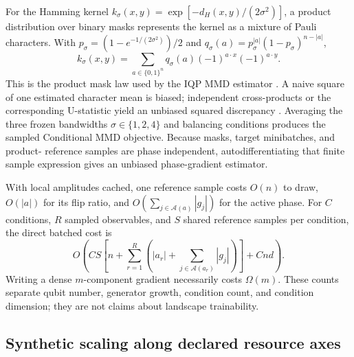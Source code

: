 \documentclass[a4paper,twocolumn,11pt,unpublished]{quantumarticle}
\newcommand{\bits}{\{0,1\}}
\begin{document}
For the Hamming kernel
$k_\sigma(x,y)=\exp[-d_H(x,y)/(2\sigma^2)]$, a product distribution over
binary masks represents the kernel as a mixture of Pauli characters.  With
$p_\sigma=(1-e^{-1/(2\sigma^2)})/2$ and
$q_\sigma(a)=p_\sigma^{|a|}(1-p_\sigma)^{n-|a|}$,
\begin{equation}
 k_\sigma(x,y)=\sum_{a\in\bits^n}q_\sigma(a)
 (-1)^{a\cdot x}(-1)^{a\cdot y}.
 \label{eq:hamming-character-mixture}
\end{equation}
This is the product mask law used by the IQP MMD estimator
\cite{recio-armengolTrainClassicalDeploy2026}.  A naive
square of one estimated character mean is biased; independent cross-products
or the corresponding U-statistic yield an unbiased squared discrepancy
\cite{grettonKernelTwoSample2012}.  Averaging the three frozen bandwidths
$\sigma\in\{1,2,4\}$ and balancing conditions produces the sampled
Conditional MMD objective.  Because masks, target minibatches, and product-
reference samples are phase independent, autodifferentiating that finite
sample expression gives an unbiased phase-gradient estimator.

\begin{center}
\end{center}

With local amplitudes cached, one reference sample costs $O(n)$ to draw,
$O(|a|)$ for its flip ratio, and
$O(\sum_{j\in\mathcal A(a)}|g_j|)$ for the active phase.  For $C$ conditions,
$R$ sampled observables, and $S$ shared reference samples per condition, the
direct batched cost is
\begin{equation}
 O\!\left(CS\left[n+\sum_{r=1}^{R}
 \left(|a_r|+\sum_{j\in\mathcal A(a_r)}|g_j|\right)\right]+Cnd\right).
\end{equation}
Writing a dense $m$-component gradient necessarily costs $\Omega(m)$.  These
counts separate qubit number, generator growth, condition count, and condition
dimension; they are not claims about landscape trainability.

\subsection{Synthetic scaling along declared resource axes}
\end{document}
